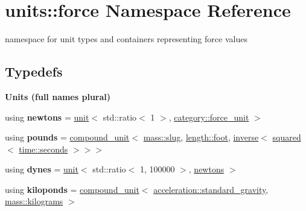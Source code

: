 \hypertarget{namespaceunits_1_1force}{}\section{units\+:\+:force Namespace Reference}
\label{namespaceunits_1_1force}


namespace for unit types and containers representing force values  


\subsection*{Typedefs}
\begin{Indent}{\bf Units (full names plural)}\par
\begin{DoxyCompactItemize}
\item 
\hypertarget{namespaceunits_1_1force_a93194a631654c286811c81d8ce17fda8}{}using {\bfseries newtons} = \hyperlink{structunits_1_1unit}{unit}$<$ std\+::ratio$<$ 1 $>$, \hyperlink{namespaceunits_1_1category_aac6f93abf7809deaddcec0f6edec7cc3}{category\+::force\+\_\+unit} $>$\label{namespaceunits_1_1force_a93194a631654c286811c81d8ce17fda8}

\item 
\hypertarget{namespaceunits_1_1force_a5dac800717ae0c80f36813bcca58bdcf}{}using {\bfseries pounds} = \hyperlink{group___unit_types_ga9c3f6f077dc894620e1ed8358442a8f1}{compound\+\_\+unit}$<$ \hyperlink{structunits_1_1unit}{mass\+::slug}, \hyperlink{structunits_1_1unit}{length\+::foot}, \hyperlink{group___unit_manipulators_gaacc539ef162e24b260d023d3ff949b57}{inverse}$<$ \hyperlink{group___unit_manipulators_ga636346f7898c35eb98a796bec1d77fb2}{squared}$<$ \hyperlink{structunits_1_1unit}{time\+::seconds} $>$$>$$>$\label{namespaceunits_1_1force_a5dac800717ae0c80f36813bcca58bdcf}

\item 
\hypertarget{namespaceunits_1_1force_a3b8b3ca60a94bf931dbfbb35337cddc4}{}using {\bfseries dynes} = \hyperlink{structunits_1_1unit}{unit}$<$ std\+::ratio$<$ 1, 100000 $>$, \hyperlink{structunits_1_1unit}{newtons} $>$\label{namespaceunits_1_1force_a3b8b3ca60a94bf931dbfbb35337cddc4}

\item 
\hypertarget{namespaceunits_1_1force_a21937c78b50e5e5b65b64b0e4760ef24}{}using {\bfseries kiloponds} = \hyperlink{group___unit_types_ga9c3f6f077dc894620e1ed8358442a8f1}{compound\+\_\+unit}$<$ \hyperlink{structunits_1_1unit}{acceleration\+::standard\+\_\+gravity}, \hyperlink{structunits_1_1unit}{mass\+::kilograms} $>$\label{namespaceunits_1_1force_a21937c78b50e5e5b65b64b0e4760ef24}


\end{DoxyCompactItemize}
\end{Indent}
